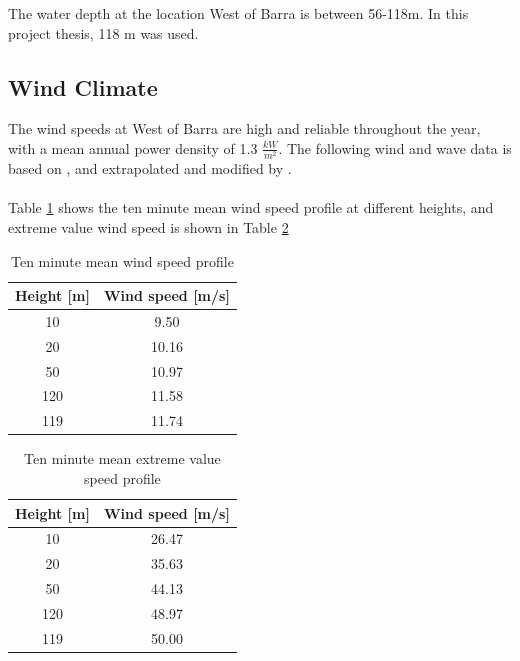 \noindent The water depth at the location West of Barra is between 56-118m. In this project thesis, 118 m was used. 

\subsection{Wind Climate}
\label{sec:windcli}

The wind speeds at West of Barra are high and reliable throughout the year, with a mean annual power density of 1.3 $\frac{kW}{m^2}$. The following wind and wave data is based on \cite{geos2001}, and extrapolated and modified by \cite{Lifes50+D1.1}. 
\\\\
Table \ref{table:wind} shows the ten minute mean wind speed profile at different heights, and extreme value wind speed is shown in Table  \ref{table:windex}
\begin{table} [H]
\centering
\begin{tabular}{ |c|c|}
\hline
 Height [m]& Wind speed [m/s]\\
 \hline
 \hline
 10 & 9.50 \\

 20 & 10.16 \\
 
 50 & 10.97 \\
 
 120 & 11.58 \\

 119 & 11.74  \\
 \hline
\end{tabular}
\caption{Ten minute mean wind speed profile}
\label{table:wind}
\end{table}

\begin{table} [H]
\centering
\begin{tabular}{ |c|c|}
\hline
 Height [m]& Wind speed [m/s]\\
 \hline
 \hline
 10 & 26.47 \\

 20 & 35.63 \\
 
 50 & 44.13 \\
 
 120 & 48.97 \\

 119 & 50.00  \\
 \hline
\end{tabular}
\caption{Ten minute mean extreme value speed profile}
\label{table:windex}
\end{table}

